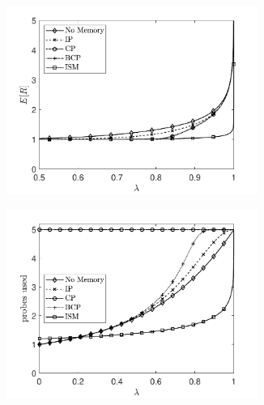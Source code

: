 \documentclass[12pt]{report}
\begin{document}
\begin{figure}[t]
\begin{subfigure}{.45\textwidth}
\centering
\captionsetup{width=.8\linewidth}
\includegraphics[width=0.9\textwidth]{figures/Chapter6/plot_ER_ifo_lamA4.pdf}
\label{fig:num_exp_ER}
\end{subfigure}
\begin{subfigure}{.45\textwidth}
\centering
\captionsetup{width=.8\linewidth}
\includegraphics[width=0.9\textwidth]{figures/Chapter6/plot_probes_stop_probing_full_usedA4.pdf}
\label{fig:num_probes}
\end{subfigure}
\begin{subfigure}{.45\textwidth}
\centering
\captionsetup{width=.8\linewidth}

\end{subfigure}
\end{figure}
\end{document}
